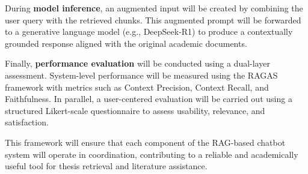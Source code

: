 \begin{refsection}
During \textbf{model inference}, an augmented input will be created by combining the user query with the retrieved chunks. This augmented prompt will be forwarded to a generative language model (e.g., DeepSeek-R1) to produce a contextually grounded response aligned with the original academic documents.

Finally, \textbf{performance evaluation} will be conducted using a dual-layer assessment. System-level performance will be measured using the RAGAS framework with metrics such as Context Precision, Context Recall, and Faithfulness. In parallel, a user-centered evaluation will be carried out using a structured Likert-scale questionnaire to assess usability, relevance, and satisfaction.

This framework will ensure that each component of the RAG-based chatbot system will operate in coordination, contributing to a reliable and academically useful tool for thesis retrieval and literature assistance.

\clearpage

\printbibliography[heading=subbibintoc, title={\centering Notes}]
\end{refsection}